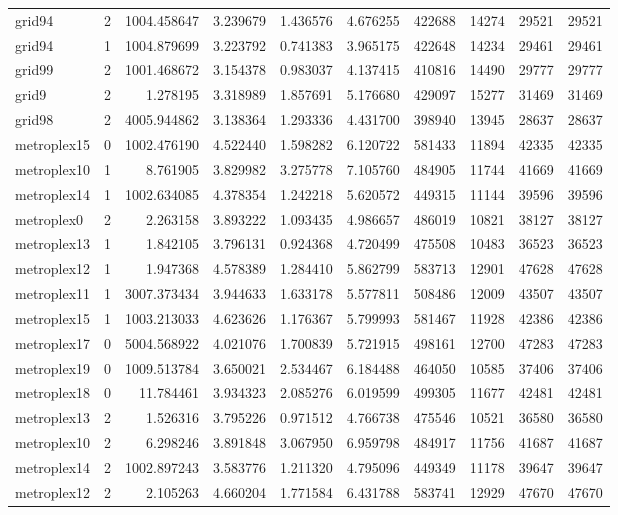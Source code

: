 \documentclass[../../../thesis.tex]{subfiles}
\begin{document}
\begin{longtable}{|l|r|r|r|r|r|r|r|r|r|}
grid94 & 2 & 1004.458647 & 3.239679 & 1.436576 & 4.676255 & 422688 & 14274 & 29521 & 29521 \\
grid94 & 1 & 1004.879699 & 3.223792 & 0.741383 & 3.965175 & 422648 & 14234 & 29461 & 29461 \\
grid99 & 2 & 1001.468672 & 3.154378 & 0.983037 & 4.137415 & 410816 & 14490 & 29777 & 29777 \\
grid9 & 2 & 1.278195 & 3.318989 & 1.857691 & 5.176680 & 429097 & 15277 & 31469 & 31469 \\
grid98 & 2 & 4005.944862 & 3.138364 & 1.293336 & 4.431700 & 398940 & 13945 & 28637 & 28637 \\
metroplex15 & 0 & 1002.476190 & 4.522440 & 1.598282 & 6.120722 & 581433 & 11894 & 42335 & 42335 \\
metroplex10 & 1 & 8.761905 & 3.829982 & 3.275778 & 7.105760 & 484905 & 11744 & 41669 & 41669 \\
metroplex14 & 1 & 1002.634085 & 4.378354 & 1.242218 & 5.620572 & 449315 & 11144 & 39596 & 39596 \\
metroplex0 & 2 & 2.263158 & 3.893222 & 1.093435 & 4.986657 & 486019 & 10821 & 38127 & 38127 \\
metroplex13 & 1 & 1.842105 & 3.796131 & 0.924368 & 4.720499 & 475508 & 10483 & 36523 & 36523 \\
metroplex12 & 1 & 1.947368 & 4.578389 & 1.284410 & 5.862799 & 583713 & 12901 & 47628 & 47628 \\
metroplex11 & 1 & 3007.373434 & 3.944633 & 1.633178 & 5.577811 & 508486 & 12009 & 43507 & 43507 \\
metroplex15 & 1 & 1003.213033 & 4.623626 & 1.176367 & 5.799993 & 581467 & 11928 & 42386 & 42386 \\
metroplex17 & 0 & 5004.568922 & 4.021076 & 1.700839 & 5.721915 & 498161 & 12700 & 47283 & 47283 \\
metroplex19 & 0 & 1009.513784 & 3.650021 & 2.534467 & 6.184488 & 464050 & 10585 & 37406 & 37406 \\
metroplex18 & 0 & 11.784461 & 3.934323 & 2.085276 & 6.019599 & 499305 & 11677 & 42481 & 42481 \\
metroplex13 & 2 & 1.526316 & 3.795226 & 0.971512 & 4.766738 & 475546 & 10521 & 36580 & 36580 \\
metroplex10 & 2 & 6.298246 & 3.891848 & 3.067950 & 6.959798 & 484917 & 11756 & 41687 & 41687 \\
metroplex14 & 2 & 1002.897243 & 3.583776 & 1.211320 & 4.795096 & 449349 & 11178 & 39647 & 39647 \\
metroplex12 & 2 & 2.105263 & 4.660204 & 1.771584 & 6.431788 & 583741 & 12929 & 47670 & 47670 \\

\end{longtable}
\end{document}
